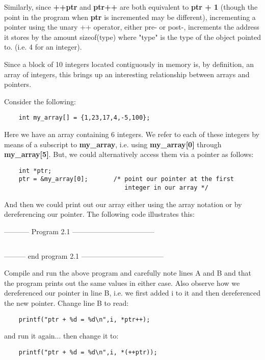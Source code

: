 Similarly, since \textbf{++ptr} and \textbf{ptr++} are both equivalent
to \textbf{ptr + 1} (though the point in the program when \textbf{ptr}
is incremented may be different), incrementing a pointer using the unary
++ operator, either pre- or post-, increments the address it stores by
the amount sizeof(type) where "type" is the type of the object pointed
to. (i.e. 4 for an integer).

Since a block of 10 integers located contiguously in memory is, by
definition, an array of integers, this brings up an interesting
relationship between arrays and pointers.

Consider the following:

\begin{verbatim}
    int my_array[] = {1,23,17,4,-5,100}; 
\end{verbatim}

Here we have an array containing 6 integers. We refer to each of these
integers by means of a subscript to \textbf{my\_array}, i.e. using
\textbf{my\_array{[}0{]}} through \textbf{my\_array{[}5{]}}. But, we
could alternatively access them via a pointer as follows:

\begin{verbatim}
    int *ptr;
    ptr = &my_array[0];       /* point our pointer at the first
                                 integer in our array */ 
\end{verbatim}

And then we could print out our array either using the array notation or
by dereferencing our pointer. The following code illustrates this:

-----------  Program 2.1  -----------------------------------
\inputminted[breaklines]{c}{../src/ch2-1.c}
--------- end program 2.1 -----------------------------------

Compile and run the above program and carefully note lines A and B and
that the program prints out the same values in either case. Also observe
how we dereferenced our pointer in line B, i.e. we first added i to it
and then dereferenced the new pointer. Change line B to read:

\begin{verbatim}
    printf("ptr + %d = %d\n",i, *ptr++);
\end{verbatim}

and run it again... then change it to:

\begin{verbatim}
    printf("ptr + %d = %d\n",i, *(++ptr));
\end{verbatim}

